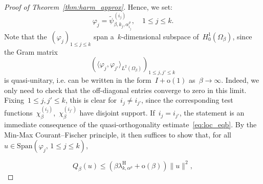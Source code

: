 \documentclass[10pt]{article}
\newcommand{\1}{\mathbbm 1}
\newcommand{\shift}{\rho} %
\renewcommand{\o}{\mathrm{o}}
\begin{document}
\begin{proof}[Proof of Theorem~\ref{thm:harm_approx}]
        Hence, we set:
        \[\varphi_j = \widetilde\psi_{\beta,k_j,\alpha^\shift_{i_j}}^{(i_j)}, \quad 1\leq j\leq k.\]
        Note that the~$(\varphi_j)_{1\leq j \leq k}$ span a~$k$-dimensional subspace of~$H_0^1(\Omega_\beta)$, since the Gram matrix~$$\left(\langle \varphi_j,\varphi_{j'}\rangle_{L^2(\Omega_\beta)}\right)_{1\leq j,j'\leq k}$$ is quasi-unitary, i.e. can be written in the form~$I + \mathrm{o}(1)$ as~$\beta\to\infty$. Indeed, we only need to check that the off-diagonal entries converge to zero in this limit.
        Fixing~$1\leq j,j'\leq k$, this is clear for~$i_j \neq i_{j'}$, since the corresponding test functions~$\chi_\beta^{(i_j)}$,~$\chi_\beta^{(i_{j'})}$ have disjoint support. If~$i_j = i_{j'}$, the statement is an immediate consequence of the quasi-orthogonality estimate~\eqref{eq:loc_eqb}.
        By the Min-Max Courant--Fischer principle, it then suffices to show that, for all~$u\in \mathrm{Span}(\varphi_j,\,1\leq j \leq k)$,
        
        \begin{equation}
            \label{eq:thm1_ub}
            Q_\beta(u) \leq (\beta\lambda_{k,\alpha^\shift}^{\mathrm{H}}+\o(\beta))\|u\|^2,
        \end{equation}


\end{proof}
\end{document}
